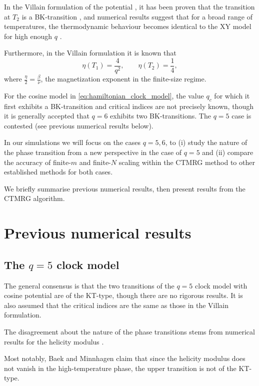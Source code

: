 In the Villain formulation of the potential \cite{villain1975theory}, it has been proven that the transition at $T_2$ is
a BK-transition \cite{jose1977renormalization}, and numerical results suggest that for a broad range of temperatures,
the thermodynamic behaviour becomes identical to the XY model for high enough $q$ \cite{lapilli2006universality}.

Furthermore, in the Villain formulation it is known that \cite{elitzur1979phase, nienhuis1984critical}
\begin{equation}\label{eq:eta_villain}
  \eta(T_1) =\frac{4}{q^2}, \qquad \eta(T_2) = \frac{1}{4},
\end{equation}
where $\frac{\eta}{2} = \frac{\beta}{\nu}$, the magnetization exponent in the finite-size regime.

For the cosine model in \autoref{eq:hamiltonian_clock_model}, the value $q_c$ for which it first exhibits a
BK-transition and critical indices are not precisely known, though it is generally accepted that $q = 6$ exhibits two
BK-transitions. The $q = 5$ case is contested (see previous numerical results below).

In our simulations we will focus on the cases $q = 5, 6$, to (i) study the nature of the phase transition from a new
perspective in the case of $q = 5$ and (ii) compare the accuracy of finite-$m$ and finite-$N$ scaling within the CTMRG
method to other established methods for both cases.

We briefly summarise previous numerical results, then present results from the CTMRG algorithm.

\section{Previous numerical results}
\subsection{The $q = 5$ clock model}

The general consensus is that the two transitions of the $q = 5$ clock model with cosine potential are of the KT-type,
though there are no rigorous results.
It is also assumed that the critical indices are the same as those in the Villain formulation.

The disagreement about the nature of the phase transitions
stems from numerical results for the helicity modulus
\cite{fisher1973helicity}.

Most notably, Baek and Minnhagen \cite{baek2010non} claim that since the helicity modulus does
not vanish in the high-temperature phase, the upper transition is not of the KT-type.

